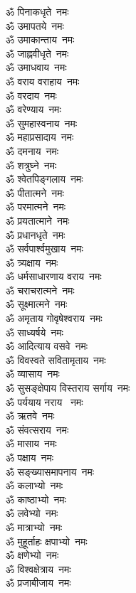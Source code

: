 \begin{multicols}{2}
\begin{flushleft}
ॐ पिनाकधृते~नमः\\
ॐ उमापतये~नमः\\
ॐ उमाकान्ताय~नमः\\
ॐ जाह्नवीधृते~नमः\\
ॐ उमाधवाय~नमः\hfill{}\\
ॐ वराय वराहाय~नमः\\
ॐ वरदाय~नमः\\
ॐ वरेण्याय~नमः\\
ॐ सुमहास्वनाय~नमः\\
ॐ महाप्रसादाय~नमः\\
ॐ दमनाय~नमः\\
ॐ शत्रुघ्ने~नमः\\
ॐ श्वेतपिङ्गलाय~नमः\\
ॐ पीतात्मने~नमः\\
ॐ परमात्मने~नमः\hfill{}\\
ॐ प्रयतात्माने~नमः\\
ॐ प्रधानधृते~नमः\\
ॐ सर्वपार्श्वमुखाय~नमः\\
ॐ त्र्यक्षाय~नमः\\
ॐ धर्मसाधारणाय वराय~नमः\\
ॐ चराचरात्मने~नमः\\
ॐ सूक्ष्मात्मने~नमः\\
ॐ अमृताय गोवृषेश्वराय~नमः\\
ॐ साध्यर्षये~नमः\\
ॐ आदित्याय वसवे~नमः\hfill{}\\
ॐ विवस्वते सवितामृताय~नमः\\
ॐ व्यासाय~नमः\\
ॐ सुसङ्क्षेपाय विस्तराय सर्गाय~नमः\\
ॐ पर्ययाय नराय ~नमः\\
ॐ ऋतवे~नमः\\
ॐ संवत्सराय~नमः\\
ॐ मासाय~नमः\\
ॐ पक्षाय~नमः\\
ॐ सङ्ख्यासमापनाय~नमः\\
ॐ कलाभ्यो~नमः\hfill{}\\
ॐ काष्ठाभ्यो~नमः\\
ॐ लवेभ्यो~नमः\\
ॐ मात्राभ्यो~नमः\\
ॐ मुहूर्ताहः क्षपाभ्यो~नमः\\
ॐ क्षणेभ्यो~नमः\\
ॐ विश्वक्षेत्राय~नमः\\
ॐ प्रजाबीजाय~नमः\\

\end{flushleft}
\end{multicols}
